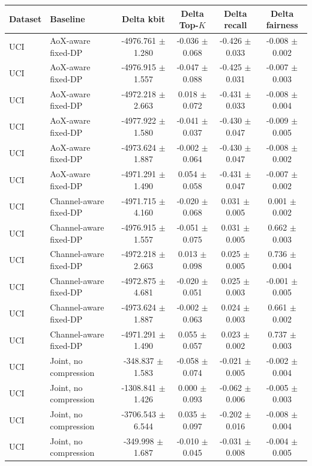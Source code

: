 \begin{tabular}{llcccc}
\toprule
Dataset & Baseline & Delta kbit & Delta Top-$K$ & Delta recall & Delta fairness \\
\midrule
UCI & AoX-aware fixed-DP & -4976.761 $\pm$ 1.280 & -0.036 $\pm$ 0.068 & -0.426 $\pm$ 0.033 & -0.008 $\pm$ 0.002 \\
UCI & AoX-aware fixed-DP & -4976.915 $\pm$ 1.557 & -0.047 $\pm$ 0.088 & -0.425 $\pm$ 0.031 & -0.007 $\pm$ 0.003 \\
UCI & AoX-aware fixed-DP & -4972.218 $\pm$ 2.663 & 0.018 $\pm$ 0.072 & -0.431 $\pm$ 0.033 & -0.008 $\pm$ 0.004 \\
UCI & AoX-aware fixed-DP & -4977.922 $\pm$ 1.580 & -0.041 $\pm$ 0.037 & -0.430 $\pm$ 0.047 & -0.009 $\pm$ 0.005 \\
UCI & AoX-aware fixed-DP & -4973.624 $\pm$ 1.887 & -0.002 $\pm$ 0.064 & -0.430 $\pm$ 0.047 & -0.008 $\pm$ 0.002 \\
UCI & AoX-aware fixed-DP & -4971.291 $\pm$ 1.490 & 0.054 $\pm$ 0.058 & -0.431 $\pm$ 0.047 & -0.007 $\pm$ 0.002 \\
UCI & Channel-aware fixed-DP & -4971.715 $\pm$ 4.160 & -0.020 $\pm$ 0.068 & 0.031 $\pm$ 0.005 & 0.001 $\pm$ 0.002 \\
UCI & Channel-aware fixed-DP & -4976.915 $\pm$ 1.557 & -0.051 $\pm$ 0.075 & 0.031 $\pm$ 0.005 & 0.662 $\pm$ 0.003 \\
UCI & Channel-aware fixed-DP & -4972.218 $\pm$ 2.663 & 0.013 $\pm$ 0.098 & 0.025 $\pm$ 0.005 & 0.736 $\pm$ 0.004 \\
UCI & Channel-aware fixed-DP & -4972.875 $\pm$ 4.681 & -0.020 $\pm$ 0.051 & 0.025 $\pm$ 0.003 & -0.001 $\pm$ 0.005 \\
UCI & Channel-aware fixed-DP & -4973.624 $\pm$ 1.887 & -0.002 $\pm$ 0.063 & 0.024 $\pm$ 0.003 & 0.661 $\pm$ 0.002 \\
UCI & Channel-aware fixed-DP & -4971.291 $\pm$ 1.490 & 0.055 $\pm$ 0.057 & 0.023 $\pm$ 0.002 & 0.737 $\pm$ 0.003 \\
UCI & Joint, no compression & -348.837 $\pm$ 1.583 & -0.058 $\pm$ 0.074 & -0.021 $\pm$ 0.005 & -0.002 $\pm$ 0.004 \\
UCI & Joint, no compression & -1308.841 $\pm$ 1.426 & 0.000 $\pm$ 0.093 & -0.062 $\pm$ 0.006 & -0.005 $\pm$ 0.003 \\
UCI & Joint, no compression & -3706.543 $\pm$ 6.544 & 0.035 $\pm$ 0.097 & -0.202 $\pm$ 0.016 & -0.008 $\pm$ 0.004 \\
UCI & Joint, no compression & -349.998 $\pm$ 1.687 & -0.010 $\pm$ 0.045 & -0.031 $\pm$ 0.008 & -0.004 $\pm$ 0.005 \\

\end{tabular}

